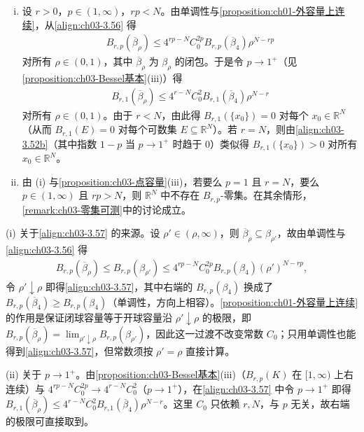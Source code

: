 \documentclass[../../main.tex]{subfiles}%
\begin{document}
\begin{remark}\label{remark:ch03-无零容量集}
\begin{enumerate}[(i)]
\item 设 $r>0$，$p\in(1,\infty)$，$rp<N$。由单调性与\cref{proposition:ch01-外容量上连续}，从\eqref{align:ch03-3.56} 得
\begin{align}
B_{r,p}(\overline{\beta}_\rho)\leqslant 4^{rp-N}C_0^{2p}B_{r,p}(\overline{\beta}_4)\rho^{N-rp}\label{align:ch03-3.57}
\end{align}
对所有 $\rho\in(0,1)$，其中 $\overline{\beta}_\rho$ 为 $\beta_\rho$ 的闭包。于是令 $p\to1^+$（见\cref{proposition:ch03-Bessel基本}(iii)）得
\begin{align*}
B_{r,1}(\overline{\beta}_\rho)\leqslant 4^{r-N}C_0^2B_{r,1}(\overline{\beta}_4)\rho^{N-r}
\end{align*}
对所有 $\rho\in(0,1)$。由于 $r<N$，由此得 $B_{r,1}(\{x_0\})=0$ 对每个 $x_0\in\mathbb{R}^N$（从而 $B_{r,1}(E)=0$ 对每个可数集 $E\subseteq\mathbb{R}^N$）。若 $r=N$，则由\eqref{align:ch03-3.52b}（其中指数 $1-p$ 当 $p\to1^+$ 时趋于 $0$）类似得 $B_{r,1}(\{x_0\})>0$ 对所有 $x_0\in\mathbb{R}^N$。
\item 由 (i) 与\cref{proposition:ch03-点容量}(iii)，若要么 $p=1$ 且 $r=N$，要么 $p\in(1,\infty)$ 且 $rp>N$，则 $\mathbb{R}^N$ 中不存在 $B_{r,p}$-零集。在其余情形，\cref{remark:ch03-零集可测}中的讨论成立。
\end{enumerate}
\end{remark}

\begin{remark}\label{remark:ch03-无零容量集补充}
(i) 关于\eqref{align:ch03-3.57} 的来源。设 $\rho'\in(\rho,\infty)$，则 $\overline{\beta}_\rho\subseteq\beta_{\rho'}$，故由单调性与\eqref{align:ch03-3.56} 得
\begin{align*}
B_{r,p}(\overline{\beta}_\rho)\leqslant B_{r,p}(\beta_{\rho'})\leqslant 4^{rp-N}C_0^{2p}B_{r,p}(\beta_4)(\rho')^{N-rp},
\end{align*}
令 $\rho'\downarrow\rho$ 即得\eqref{align:ch03-3.57}，其中右端的 $B_{r,p}(\beta_4)$ 换成了 $B_{r,p}(\overline{\beta}_4)\geqslant B_{r,p}(\beta_4)$（单调性，方向上相容）。\cref{proposition:ch01-外容量上连续} 的作用是保证闭球容量等于开球容量沿 $\rho'\downarrow\rho$ 的极限，即 $B_{r,p}(\overline{\beta}_\rho)=\lim_{\rho'\downarrow\rho}B_{r,p}(\beta_{\rho'})$，因此这一过渡不改变常数 $C_0$；只用单调性也能得到\eqref{align:ch03-3.57}，但常数须按 $\rho'=\rho$ 直接计算。

(ii) 关于 $p\to1^+$。由\cref{proposition:ch03-Bessel基本}(iii)（$B_{r,p}(K)$ 在 $[1,\infty)$ 上右连续）与 $4^{rp-N}C_0^{2p}\to4^{r-N}C_0^2$（$p\to1^+$），在\eqref{align:ch03-3.57} 中令 $p\to1^+$ 即得 $B_{r,1}(\overline{\beta}_\rho)\leqslant4^{r-N}C_0^2B_{r,1}(\overline{\beta}_4)\rho^{N-r}$。这里 $C_0$ 只依赖 $r,N$，与 $p$ 无关，故右端的极限可直接取到。
\end{remark}
\end{document}
